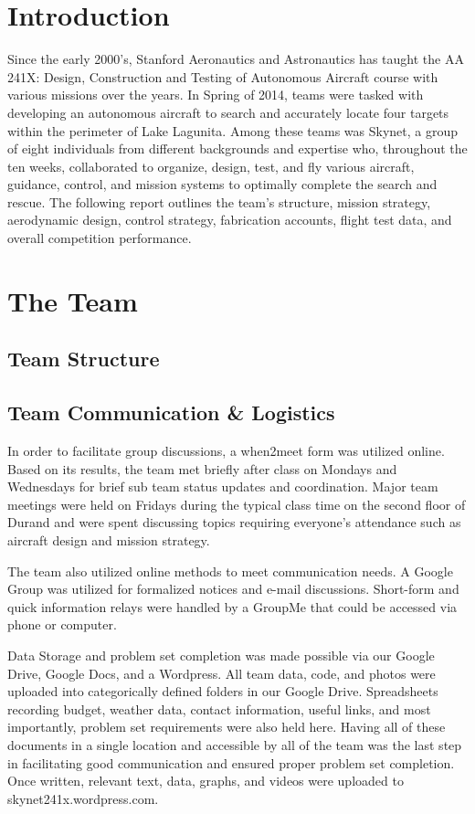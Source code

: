 \documentclass[11pt]{article}
\begin{document}
\clearpage
\tableofcontents
\vfill
\clearpage

\section{Introduction}
\label{Introduction}
Since the early 2000's, Stanford Aeronautics and Astronautics has taught the AA 241X: Design, Construction and Testing of Autonomous Aircraft course with various missions over the years. In Spring of 2014, teams were tasked with developing an autonomous aircraft to search and accurately locate four targets within the perimeter of Lake Lagunita. Among these teams was Skynet, a group of eight individuals from different backgrounds and expertise who, throughout the ten weeks, collaborated to organize, design, test, and fly various aircraft, guidance, control, and mission systems to optimally complete the search and rescue. The following report outlines the team's structure, mission strategy, aerodynamic design, control strategy, fabrication accounts, flight test data, and overall competition performance.

\section{The Team}
\label{Team}
\subsection{Team Structure}
\label{TeamStrc}
\subsection{Team Communication \& Logistics}
\label{TeamCommLog}
In order to facilitate group discussions, a when2meet form was utilized online. Based on its results, the team met briefly after class on Mondays and Wednesdays for brief sub team status updates and coordination. Major team meetings were held on Fridays during the typical class time on the second floor of Durand and were spent discussing topics requiring everyone's attendance such as aircraft design and mission strategy.

The team also utilized online methods to meet communication needs. A Google Group was utilized for formalized notices and e-mail discussions. Short-form and quick information relays were handled by a GroupMe that could be accessed via phone or computer.

Data Storage and problem set completion was made possible via our Google Drive, Google Docs, and a Wordpress. All team data, code, and photos were uploaded into categorically defined folders in our Google Drive. Spreadsheets recording budget, weather data, contact information, useful links, and most importantly, problem set requirements were also held here. Having all of these documents in a single location and accessible by all of the team was the last step in facilitating good communication and ensured proper problem set completion. Once written, relevant text, data, graphs, and videos were uploaded to skynet241x.wordpress.com.
\end{document}
